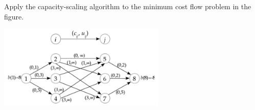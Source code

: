 \documentclass[fleqn]{homework}
\begin{document}
  \maketitle

  \begin{problem}{1}
    \begin{question}
      Apply the capacity-scaling algorithm to the minimum cost flow problem in
      the figure.

      \includegraphics[width=0.6\textwidth]{p1.png}
    \end{question}
  \end{problem}
\end{document}
